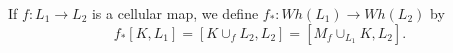 If $f: L_1 \rightarrow L_2$ is a cellular map, we define $f_*: Wh(L_1) \rightarrow Wh(L_2)$ by
$$f_*[K, L_1] = [K \cup_f L_2, L_2] = [M_f \cup_{L_1} K, L_2].$$
